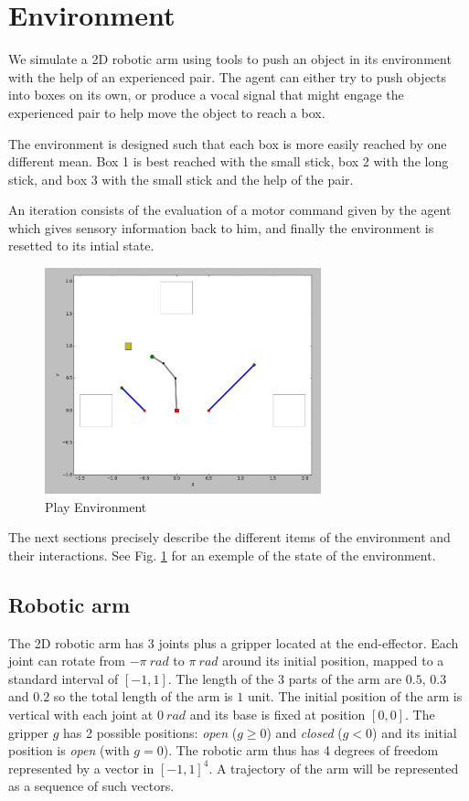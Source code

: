 \documentclass[conference]{include/IEEEtran}
\begin{document}
%


\section{Environment}

	We simulate a 2D robotic arm using tools to push an object in its environment with the help of an experienced pair. 
	The agent can either try to push objects into boxes on its own, or produce a vocal signal that might engage the experienced pair to help move the object to reach a box.
	
	The environment is designed such that each box is more easily reached by one different mean.
	Box 1 is best reached with the small stick, box 2 with the long stick, and box 3 with the small stick and the help of the pair.
	
	An iteration consists of the evaluation of a motor command given by the agent which gives
	sensory information back to him, and 
	finally the environment is resetted to its intial state.
	
	\begin{figure}[!t]
		\centering
		\includegraphics[width=8cm]{./include/tools.png}
		\caption{Play Environment}
		\label{env}
	\end{figure}
		
	The next sections precisely describe the different items of the environment and their interactions.	
	See Fig. \ref{env} for an exemple of the state of the environment. 
	

	\subsection{Robotic arm}
	
		The 2D robotic arm has 3 joints plus a gripper located at the end-effector.
		Each joint can rotate from $-\pi~rad$ to $\pi~rad$ around its initial position, mapped to a standard interval of $[-1,1]$.
		The length of the 3 parts of the arm are $0.5$, $0.3$ and $0.2$ so the total length of the arm is $1$ unit.
		The initial position of the arm is vertical with each joint at $0~rad$ and its base is fixed at position $[0, 0]$.
		The gripper $g$ has 2 possible positions: \textit{open} ($g \geq 0$) and \textit{closed} ($g < 0$) and its initial position is \textit{open} (with $g = 0$).
		The robotic arm thus has 4 degrees of freedom represented by a vector in $[-1,1]^4$.
		A trajectory of the arm will be represented as a sequence of such vectors.
	
\end{document}
